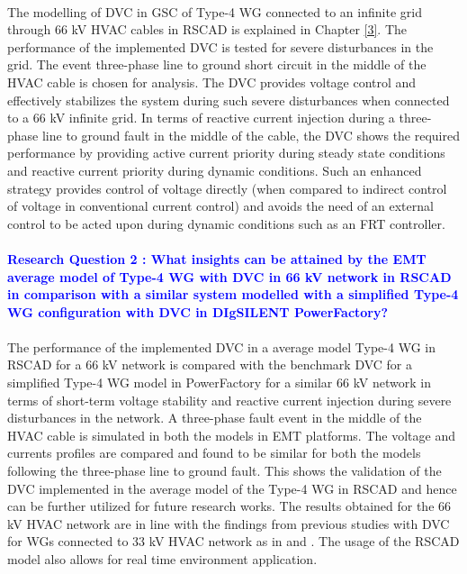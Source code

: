 \paragraph{} The modelling of \gls{DVC} in \gls{GSC} of Type-4 \gls{WG} connected to an infinite grid through 66 kV \gls{HVAC} cables in RSCAD is explained in Chapter \ref{3}. The performance of the implemented \gls{DVC} is tested for severe disturbances in the grid. The event three-phase line to ground short circuit in the middle of the \gls{HVAC} cable is chosen for analysis. The \gls{DVC} provides voltage control and effectively stabilizes the system during such severe disturbances when connected to a 66 kV infinite grid. In terms of reactive current injection during a three-phase line to ground fault in the middle of the cable, the \gls{DVC} shows the required performance by providing active current priority during steady state conditions and reactive current priority during dynamic conditions. Such an enhanced strategy provides control of voltage directly (when compared to indirect control of voltage in conventional current control) and avoids the need of an external control to be acted upon during dynamic conditions such as an FRT controller. 

\paragraph{\textcolor{blue}{Research Question 2 : What insights can be attained by the \gls{EMT} average model of Type-4 \gls{WG} with \gls{DVC} in 66 kV network in RSCAD in comparison with a similar system modelled with a simplified Type-4 \gls{WG} configuration with \gls{DVC} in DIgSILENT PowerFactory?}}

\paragraph{} The performance of the implemented \gls{DVC} in a average model Type-4 \gls{WG} in RSCAD for a 66 kV network is compared with the benchmark \gls{DVC} for a simplified Type-4 \gls{WG} model in PowerFactory for a similar 66 kV network in terms of short-term voltage stability and reactive current injection during severe disturbances in the network. A three-phase fault event in the middle of the \gls{HVAC} cable is simulated in both the models in \gls{EMT} platforms. The voltage and currents profiles are compared and found to be similar for both the models following the three-phase line to ground fault. This shows the validation of the \gls{DVC} implemented in the average model of the Type-4 \gls{WG} in RSCAD and hence can be further utilized for future research works. The results obtained for the 66 kV \gls{HVAC} network are in line with the findings from previous studies with \gls{DVC} for \gls{WG}s connected to 33 kV \gls{HVAC} network as in \cite{korai_dynamic_2019} and \cite{sethi_real-time_nodate-new}. The usage of the RSCAD model also allows for real time environment application.    

